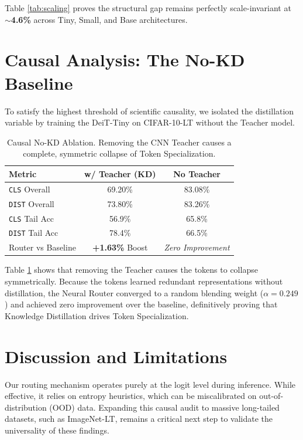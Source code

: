 \documentclass[10pt,twocolumn,letterpaper]{article}
\begin{document}
Table \ref{tab:scaling} proves the structural gap remains perfectly scale-invariant at \textbf{$\sim$4.6\%} across Tiny, Small, and Base architectures.

\section{Causal Analysis: The No-KD Baseline}

To satisfy the highest threshold of scientific causality, we isolated the distillation variable by training the DeiT-Tiny on CIFAR-10-LT without the Teacher model. 

\begin{table}[h]
\centering
\begin{tabular}{lcc}
\toprule
\textbf{Metric} & \textbf{w/ Teacher (KD)} & \textbf{No Teacher} \\
\midrule
\texttt{CLS} Overall & 69.20\% & 83.08\% \\
\texttt{DIST} Overall & 73.80\% & 83.26\% \\
\midrule
\texttt{CLS} Tail Acc & 56.9\% & 65.8\% \\
\texttt{DIST} Tail Acc & 78.4\% & 66.5\% \\
\midrule
Router vs Baseline & \textbf{+1.63\%} Boost & \textit{Zero Improvement} \\
\bottomrule
\end{tabular}
\caption{Causal No-KD Ablation. Removing the CNN Teacher causes a complete, symmetric collapse of Token Specialization.}
\label{tab:nokd}
\end{table}

Table \ref{tab:nokd} shows that removing the Teacher causes the tokens to collapse symmetrically. Because the tokens learned redundant representations without distillation, the Neural Router converged to a random blending weight ($\alpha = 0.249$) and achieved zero improvement over the baseline, definitively proving that Knowledge Distillation drives Token Specialization.

\section{Discussion and Limitations}

Our routing mechanism operates purely at the logit level during inference. While effective, it relies on entropy heuristics, which can be miscalibrated on out-of-distribution (OOD) data. Expanding this causal audit to massive long-tailed datasets, such as ImageNet-LT, remains a critical next step to validate the universality of these findings.
\end{document}
